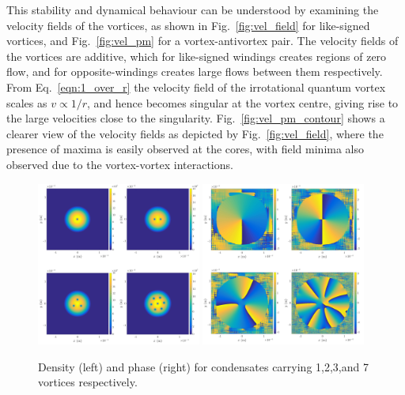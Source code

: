 This stability and dynamical behaviour can be understood by examining the velocity fields of the vortices, as shown in Fig.~\ref{fig:vel_field} for like-signed vortices, and Fig.~\ref{fig:vel_pm} for a vortex-antivortex pair. The velocity fields of the vortices are additive, which for like-signed windings creates regions of zero flow, and for opposite-windings creates large flows between them respectively. From Eq.~\ref{eqn:1_over_r} the velocity field of the irrotational quantum vortex scales as $v \propto {1/r}$, and hence becomes singular at the vortex centre, giving rise to the large velocities close to the singularity. Fig.~\ref{fig:vel_pm_contour} shows a clearer view of the velocity fields as depicted by Fig.~\ref{fig:vel_field}, where the presence of maxima is easily observed at the cores, with field minima also observed due to the vortex-vortex interactions.

\begin{figure}\centering
    \includegraphics[width=0.48\textwidth]{Images/ch4_vtx/fewvortex_rho.pdf}
    \includegraphics[width=0.48\textwidth]{Images/ch4_vtx/fewvortex_theta.pdf}
    \caption{Density (left) and phase (right) for condensates carrying 1,2,3,and 7 vortices respectively.}
    \label{fig:few_rho}
\end{figure}


